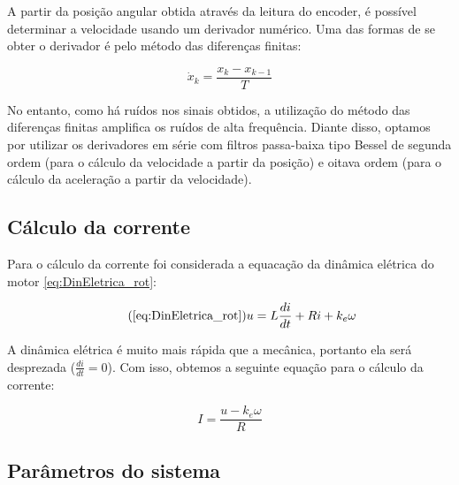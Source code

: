 \documentclass[]{politex}
\begin{document}
A partir da posição angular obtida através da leitura do encoder, é possível determinar a velocidade usando um derivador numérico. Uma das formas de se obter o derivador é pelo método das diferenças finitas:

\begin{equation}
\dot{x}_k = \frac{x_k - x_{k-1}}{T}
\end{equation}

No entanto, como há ruídos nos sinais obtidos, a utilização  do método das diferenças finitas amplifica os ruídos de alta frequência. Diante disso, optamos por utilizar os derivadores em série com filtros passa-baixa tipo Bessel de segunda ordem (para o cálculo da velocidade a partir da posição) e oitava ordem (para o cálculo da aceleração a partir da velocidade).

\subsection{Cálculo da corrente}

Para o cálculo da corrente foi considerada a equacação da dinâmica elétrica do motor \eqref{eq:DinEletrica_rot}:

\begin{equation}
\tag{\ref{eq:DinEletrica_rot}}
	   u = L \frac{di}{dt} + R i + k_{e} \omega
\end{equation}

A dinâmica elétrica é muito mais rápida que a mecânica, portanto ela será desprezada ($\frac{di}{dt} = 0$). Com isso, obtemos a seguinte equação para o cálculo da corrente:

\begin{equation}
\label{corrente}
I = \frac{u - k_e \omega}{R}
\end{equation}

\subsection{Parâmetros do sistema}
\end{document}
